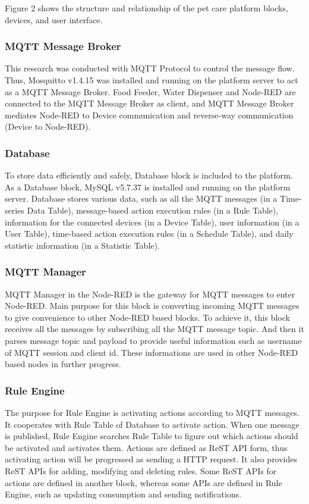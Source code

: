 \documentclass[conference]{IEEEtran}
\begin{document}
Figure 2 shows the structure and relationship of the pet care platform blocks, devices, and user interface.
\subsubsection{MQTT Message Broker}
\hfill \break This research was conducted with MQTT Protocol to control the message flow. Thus, Mosquitto v1.4.15 was installed and running on the platform server to act as a MQTT Message Broker. Food Feeder, Water Dispenser and Node-RED are connected to the MQTT Message Broker as client, and MQTT Message Broker mediates Node-RED to Device communication and reverse-way communication (Device to Node-RED).

\subsubsection{Database}
\hfill \break To store data efficiently and safely, Database block is included to the platform. As a Database block, MySQL v5.7.37 is installed and running on the platform server. Database stores various data, such as all the MQTT messages (in a Time-series Data Table), message-based action execution rules (in a Rule Table), information for the connected devices (in a Device Table), user information (in a User Table), time-based action execution rules (in a Schedule Table), and daily statistic information (in a Statistic Table).

\subsubsection{MQTT Manager}
\hfill \break MQTT Manager in the Node-RED is the gateway for MQTT messages to enter Node-RED. Main purpose for this block is converting incoming MQTT messages to give convenience to other Node-RED based blocks. To achieve it, this block receives all the messages by subscribing all the MQTT message topic. And then it parses message topic and payload to provide useful information such as username of MQTT session and client id. These informations are used in other Node-RED based nodes in further progress.

\subsubsection{Rule Engine}
\hfill \break The purpose for Rule Engine is activating actions according to MQTT messages. It cooperates with Rule Table of Database to activate action. When one message is published, Rule Engine searches Rule Table to figure out which actions should be activated and activates them. Actions are defined as ReST API form, thus activating action will be progressed as sending a HTTP request. It also provides ReST APIs for adding, modifying and deleting rules. Some ReST APIs for actions are defined in another block, whereas some APIs are defined in Rule Engine, such as updating consumption and sending notifications.
\end{document}

